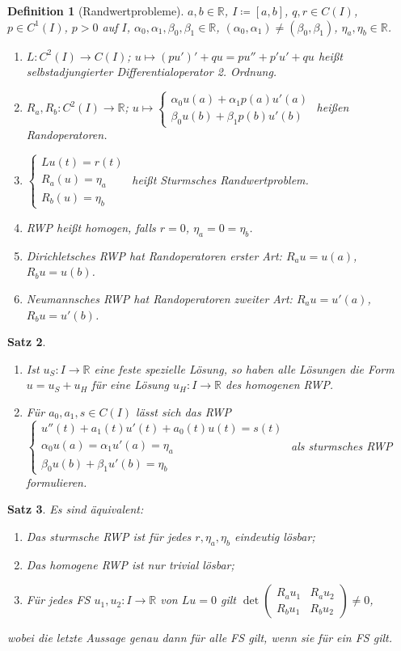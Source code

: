 \documentclass[a4paper]{article}
\newcounter{Sec}
\theoremstyle{marginbreak}
\newtheorem{definition}{Definition}[Sec]
\newtheorem{satz}[definition]{Satz}
\newcommand{\R}{\mathbb{R}}
\begin{document}
	\begin{definition}[Randwertprobleme]
		$a, b\in\R$, $I\coloneqq [a, b]$, $q, r\in C(I)$, $p\in C^1(I)$, $p>0$ auf $I$,
		$\alpha_0,\alpha_1,\beta_0,\beta_1\in\R$, $(\alpha_0,\alpha_1)\neq(\beta_0,\beta_1)$, $\eta_a,\eta_b\in\R$.
		\begin{enumerate}[label=(\alph*)]
			\item $L\colon C^2(I)\to C(I)$; $u\mapsto (pu')'+qu = pu''+p'u'+qu$ heißt selbstadjungierter
				Differentialoperator 2. Ordnung.
			\item $R_a, R_b\colon C^2(I)\to\R$; $u\mapsto\begin{cases}\alpha_0 u(a)+\alpha_1p(a)u'(a)\\
				\beta_0u(b)+\beta_1p(b)u'(b)\end{cases}$ heißen Randoperatoren.
			\item $\begin{cases}Lu(t)=r(t)\\R_a(u)=\eta_a\\R_b(u)=\eta_b\end{cases}$ heißt
				Sturmsches Randwertproblem.
			\item RWP heißt homogen, falls $r=0$, $\eta_a=0=\eta_b$.
			\item Dirichletsches RWP hat Randoperatoren erster Art: $R_au=u(a)$, $R_bu=u(b)$.
			\item Neumannsches RWP hat Randoperatoren zweiter Art: $R_au=u'(a)$, $R_bu=u'(b)$.
		\end{enumerate}
	\end{definition}
	\begin{satz}
		\begin{enumerate}[label=(\alph*)]
			\item Ist $u_S\colon I\to\R$ eine feste spezielle Lösung, so haben alle Lösungen
				die Form $u=u_S+u_H$ für eine Lösung $u_H\colon I\to\R$ des homogenen RWP.
			\item Für $a_0, a_1, s\in C(I)$ lässt sich das RWP $\begin{cases}u''(t)+a_1(t)u'(t)+a_0(t)u(t)=s(t)\\
				\alpha_0u(a)=\alpha_1u'(a)=\eta_a\\\beta_0u(b)+\beta_1u'(b)=\eta_b\end{cases}$ als sturmsches
				RWP formulieren.
		\end{enumerate}
	\end{satz}
	\begin{satz}
		Es sind äquivalent:
		\begin{enumerate}[label=(\alph*)]
			\item Das sturmsche RWP ist für jedes $r,\eta_a,\eta_b$ eindeutig lösbar;
			\item Das homogene RWP ist nur trivial lösbar;
			\item Für jedes FS $u_1, u_2\colon I\to\R$ von $Lu=0$ gilt $\det\begin{pmatrix}
				R_au_1 & R_au_2\\ R_bu_1 & R_bu_2\end{pmatrix}\neq 0$,
		\end{enumerate}
		wobei die letzte Aussage genau dann für alle FS gilt, wenn sie für ein FS gilt.
	\end{satz}
\end{document}
